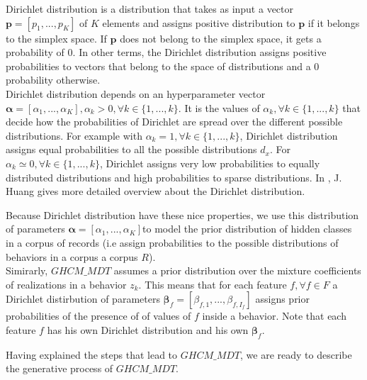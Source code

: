 Dirichlet distribution \cite{dirichlet_into} is a distribution that takes as input a vector $\mathbf{p}=[p_{1},...,p_{K}]$ of $K$ elements and assigns positive distribution to $\mathbf{p}$ if it belongs to the simplex space. If $\mathbf{p}$ does not belong to the simplex space, it gets a probability of $0$. In other terms, the Dirichlet distribution assigns positive probabilities to vectors that belong to the space of distributions and a $0$ probability otherwise.
\\Dirichlet distribution depends on an hyperparameter vector $\boldsymbol{\alpha}=[\alpha _{1},...,\alpha _{K}] ,\alpha _{k}> 0, \forall k\in \{1,...,k\}$. It is the values of $\alpha _{k}, \forall k\in \{1,...,k\}$ that decide how the probabilities of Dirichlet are spread over the different possible distributions. For example with $\alpha _{k}=1, \forall k\in \{1,...,k\}$, Dirichlet distribution assigns equal probabilities to all the possible distributions $d_{x}$. For $\alpha _{k}\simeq 0, \forall k\in \{1,...,k\}$, Dirichlet assigns very low probabilities to equally distributed distributions and high probabilities to sparse distributions. In \cite{dirichlet_into}, J. Huang gives more detailed overview about the Dirichlet distribution. \par

Because Dirichlet distribution have these nice properties, we use this distribution of parameters $\boldsymbol{\alpha}=[\alpha _{1},...,\alpha _{K}]$to model the prior distribution of hidden classes in a corpus of records (i.e assign probabilities to the possible distributions of behaviors in a corpus a corpus $R$).
\\Simirarly, $GHCM\_MDT$ assumes a prior distribution over the mixture coefficients of realizations in a behavior $z_{k}$. This means that for each feature $f, \forall f \in F$ a Dirichlet distirbution of parameters $\boldsymbol{\beta }_{f}=[\beta _{f,1},...,\beta _{f,I_{f}}]$ assigns prior probabilities of the presence of of values of $f$ inside a behavior. Note that each feature $f$ has his own Dirichlet distribution and his own $\boldsymbol{\beta }_{f}$. \par

Having explained the steps that lead to $GHCM\_MDT$, we are ready to describe the generative process of $GHCM\_MDT$.
